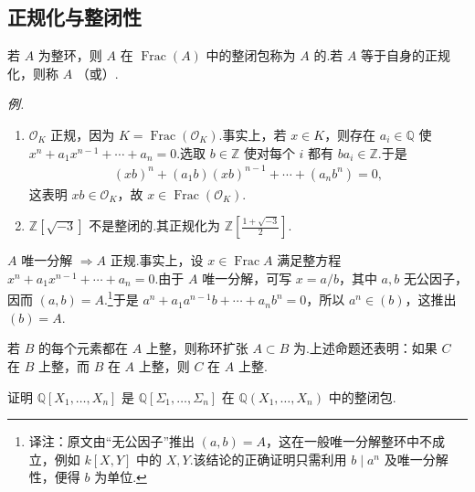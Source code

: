 \subsection{正规化与整闭性}\label{sec:nt-2-2-5}
\begin{definition*}
若 $A$ 为整环，则 $A$ 在 $\operatorname{Frac}(A)$ 中的整闭包称为 $A$ 的.若 $A$ 等于自身的正规化，则称 $A$ （或）.
\end{definition*}
\emph{例.}
\begin{enumerate}[label=\roman*)]
\item $\mathcal O_K$ 正规，因为 $K=\operatorname{Frac}(\mathcal O_K)$.事实上，若 $x\in K$，则存在 $a_i\in\mathbb Q$ 使 $x^n+a_1x^{n-1}+\cdots+a_n=0$.选取 $b\in\mathbb Z$ 使对每个 $i$ 都有 $ba_i\in\mathbb Z$.于是
\begin{align*}
(xb)^n+(a_1b)(xb)^{n-1}+\cdots+(a_nb^n)=0,
\end{align*}
这表明 $xb\in\mathcal O_K$，故 $x\in\operatorname{Frac}(\mathcal O_K)$.
\item $\mathbb Z[\sqrt{-3}]$ 不是整闭的.其正规化为 $\mathbb Z[\frac{1+\sqrt{-3}}2]$.
\end{enumerate}
\begin{example*}
$A$ 唯一分解 $\Rightarrow A$ 正规.事实上，设 $x\in\operatorname{Frac}A$ 满足整方程 $x^n+a_1x^{n-1}+\cdots+a_n=0$.由于 $A$ 唯一分解，可写 $x=a/b$，其中 $a,b$ 无公因子，因而 $(a,b)=A$.\footnote{译注：原文由``无公因子''推出 $(a,b)=A$，这在一般唯一分解整环中不成立，例如 $k[X,Y]$ 中的 $X,Y$.该结论的正确证明只需利用 $b\mid a^n$ 及唯一分解性，便得 $b$ 为单位.}于是 $a^n+a_1a^{n-1}b+\cdots+a_nb^n=0$，所以 $a^n\in(b)$，这推出 $(b)=A$.
\end{example*}
\begin{remark*}
若 $B$ 的每个元素都在 $A$ 上整，则称环扩张 $A\subset B$ 为.上述命题还表明：如果 $C$ 在 $B$ 上整，而 $B$ 在 $A$ 上整，则 $C$ 在 $A$ 上整.
\end{remark*}
\begin{exercise*}
证明 $\mathbb Q[X_1,\ldots,X_n]$ 是 $\mathbb Q[\Sigma_1,\ldots,\Sigma_n]$ 在 $\mathbb Q(X_1,\ldots,X_n)$ 中的整闭包.
\end{exercise*}


